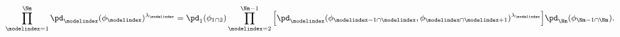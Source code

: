\begin{equation}
  \prod_{\modelindex = 1}^{\Nm}
    \pd_{\modelindex}(\phi_{\modelindex})^{\lambda_{\modelindex}}
  = 
  \pd_{1}(\phi_{1 \cap 2})
  \prod_{\modelindex = 2}^{\Nm - 1}
  \Big[
    \pd_{\modelindex}(\phi_{\modelindex - 1 \cap \modelindex}, \phi_{\modelindex \cap \modelindex + 1})^{\lambda_{\modelindex}}
  \Big]
  \pd_{\Nm}(\phi_{\Nm - 1 \cap \Nm}).
  \label{eqn:pooled-prior-log-alt-def}
\end{equation}